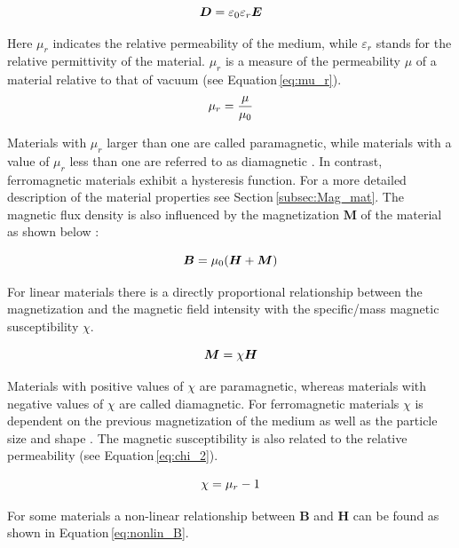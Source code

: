 \begin{equation}
\label{eq:D_tot}
\centering
\boldsymbol{D} = \varepsilon_{0}\varepsilon_{r}\boldsymbol{E}
\end{equation}

Here $\mu_{r}$ indicates the relative permeability of the medium, while $\varepsilon_{r}$ stands for the relative permittivity of the material. $\mu_{r}$ is a measure of the permeability $\mu$ of a material relative to that of vacuum (see Equation\,\ref{eq:mu_r}).
\begin{equation}
\label{eq:mu_r}
\centering
\mu_{r} = \frac{\mu}{\mu_{0}}
\end{equation}

 Materials with $\mu_{r}$ larger than one are called paramagnetic, while materials with a value of $\mu_{r}$ less than one are referred to as diamagnetic \cite{svoboda2004magnetic}. In contrast, ferromagnetic materials exhibit a hysteresis function. For a more detailed description of the material properties see Section\,\ref{subsec:Mag_mat}. The magnetic flux density is also influenced by the magnetization $\boldsymbol{M}$ of the material as shown below \cite{ichimura1989maxwell}: 

\begin{equation}
\label{eq:Mag}
\centering
\boldsymbol{B} = \mu_{0}(\boldsymbol{H} + \boldsymbol{M})
\end{equation}

For linear materials there is a directly proportional relationship between the magnetization and the magnetic field intensity with the specific/mass magnetic susceptibility $\chi$.  

\begin{equation}
\label{eq:chi}
\centering
\boldsymbol{M} = \chi\boldsymbol{H}
\end{equation}

Materials with positive values of $\chi$ are paramagnetic, whereas materials with negative values of $\chi$ are called diamagnetic. For ferromagnetic materials $\chi$ is dependent on the previous magnetization of the medium as well as the particle size and shape \cite{michalowsky2006magnettechnik}. The magnetic susceptibility is also related to the relative permeability (see Equation\,\ref{eq:chi_2}).

\begin{equation}
\label{eq:chi_2}
\centering
\chi = \mu_{r}-1
\end{equation}

For some materials a non-linear relationship between $\boldsymbol{B}$ and $\boldsymbol{H}$ can be found as shown in Equation\,\ref{eq:nonlin_B}.

